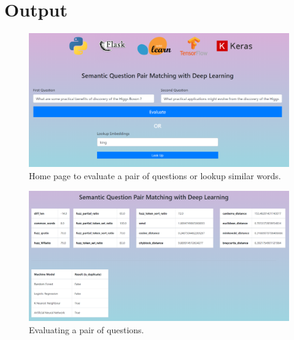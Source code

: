 \chapter{Output}

\begin{figure}[tbh]
\begin{center}
	\includegraphics[width=5.85in]{images/outputs/home.png}
	\caption{Home page to evaluate a pair of questions or lookup similar words.}
	\label{home}
\end{center}
\end{figure}

\begin{figure}[tbh]
\begin{center}
	\includegraphics[width=5.85in]{images/outputs/evaluate.png}
	\caption{Evaluating a pair of questions.}
	\label{evaluate}
\end{center}
\end{figure}

